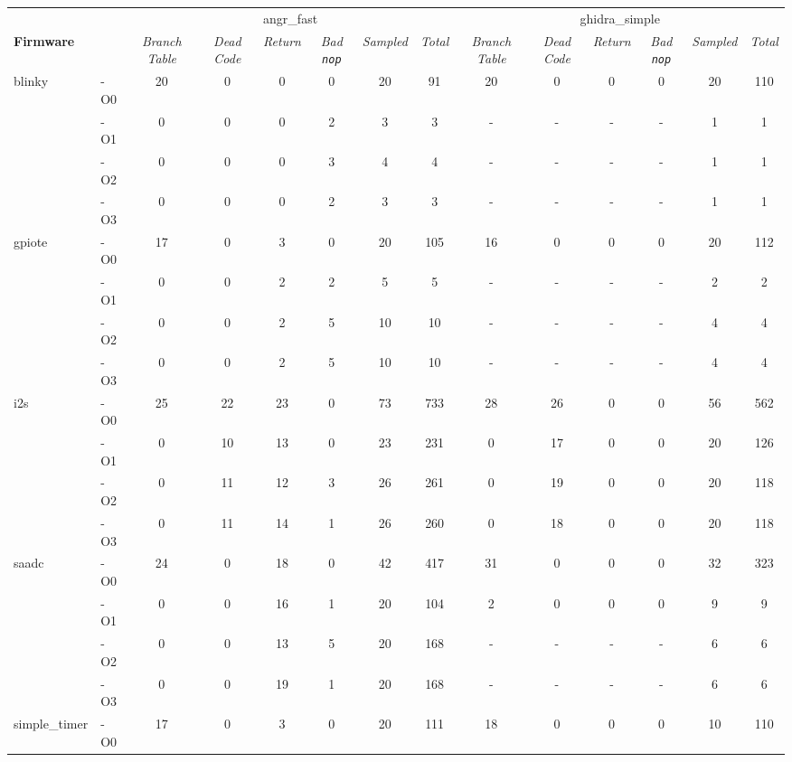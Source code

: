 \begin{tabular}{@{}ll|cccccc|cccccc@{}}
\toprule
    & & \multicolumn{6}{c}{angr\_fast} & \multicolumn{6}{c}{ghidra\_simple} \\
\multicolumn{2}{l}{\textbf{Firmware}} & \textit{Branch Table} & \textit{Dead Code} & \textit{Return} & \textit{Bad \texttt{nop}} & \textit{Sampled} & \textit{Total} & \textit{Branch Table} & \textit{Dead Code} & \textit{Return} & \textit{Bad \texttt{nop}} & \textit{Sampled} & \textit{Total} \\ \midrule
\multirow{4}{*}{blinky}
    & -O0 & 20 &  0 &  0 &  0 & 20 &  91 & 20 &  0 &  0 &  0 & 20 & 110  \\
    & -O1 &  0 &  0 &  0 &  2 &  3 &   3 &  - &  - &  - &  - &  1 &   1  \\
    & -O2 &  0 &  0 &  0 &  3 &  4 &   4 &  - &  - &  - &  - &  1 &   1  \\
    & -O3 &  0 &  0 &  0 &  2 &  3 &   3 &  - &  - &  - &  - &  1 &   1  \\ \midrule
\multirow{4}{*}{gpiote}
    & -O0 & 17 &  0 &  3 &  0 & 20 & 105 & 16 &  0 &  0 &  0 & 20 & 112  \\
    & -O1 &  0 &  0 &  2 &  2 &  5 &   5 &  - &  - &  - &  - &  2 &   2  \\
    & -O2 &  0 &  0 &  2 &  5 & 10 &  10 &  - &  - &  - &  - &  4 &   4  \\
    & -O3 &  0 &  0 &  2 &  5 & 10 &  10 &  - &  - &  - &  - &  4 &   4  \\ \midrule
\multirow{4}{*}{i2s}
    & -O0 & 25 & 22 & 23 &  0 & 73 & 733 & 28 & 26 &  0 &  0 & 56 & 562  \\
    & -O1 &  0 & 10 & 13 &  0 & 23 & 231 &  0 & 17 &  0 &  0 & 20 & 126  \\
    & -O2 &  0 & 11 & 12 &  3 & 26 & 261 &  0 & 19 &  0 &  0 & 20 & 118  \\
    & -O3 &  0 & 11 & 14 &  1 & 26 & 260 &  0 & 18 &  0 &  0 & 20 & 118  \\ \midrule
\multirow{4}{*}{saadc}
    & -O0 & 24 &  0 & 18 &  0 & 42 & 417 & 31 &  0 &  0 &  0 & 32 & 323  \\
    & -O1 &  0 &  0 & 16 &  1 & 20 & 104 &  2 &  0 &  0 &  0 &  9 &   9  \\
    & -O2 &  0 &  0 & 13 &  5 & 20 & 168 &  - &  - &  - &  - &  6 &   6  \\
    & -O3 &  0 &  0 & 19 &  1 & 20 & 168 &  - &  - &  - &  - &  6 &   6  \\ \midrule
\multirow{4}{*}{simple\_timer}
    & -O0 & 17 &  0 &  3 &  0 & 20 & 111 & 18 &  0 &  0 &  0 & 10 & 110  \\

\end{tabular}
